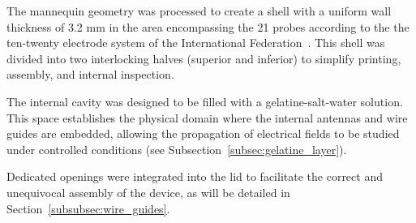 
The mannequin geometry was processed to create a shell with a uniform wall thickness of 3.2 mm in the area
 encompassing the 21 probes according to the the ten-twenty electrode system of the International 
 Federation~\cite{klem-1999}. 
This shell was divided into two interlocking halves (superior and inferior) to simplify printing, 
assembly, and internal inspection.

The internal cavity was designed to be filled with a gelatine-salt-water solution. This space establishes
 the physical domain where the internal antennas and wire guides are embedded, allowing the propagation of
  electrical fields to be studied under controlled conditions (see Subsection~\ref{subsec:gelatine_layer}).

Dedicated openings were integrated into the lid to facilitate the correct and unequivocal assembly of the device,
 as will be detailed in Section~\ref{subsubsec:wire_guides}.
